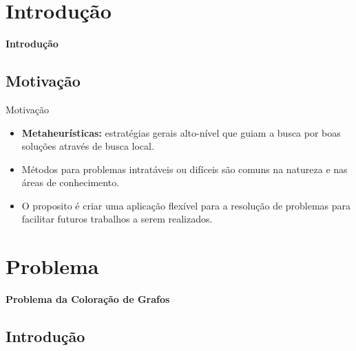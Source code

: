 

\section{Introdução}
	\begin{frame}{}
		\centering
		\Huge \color{blue} \textbf{Introdução}
	\end{frame}

	\subsection{Motivação}	
	
		\begin{frame}{Motivação \cite{Diego}}
			
			\begin{itemize}
				
				\item \textbf{Metaheurísticas:} estratégias gerais alto-nível que guiam a busca por boas soluções através de busca local.
				
				\bigskip
				
				\item Métodos para problemas intratáveis ou difíceis são comuns na natureza e nas áreas de conhecimento.
				
				\bigskip
				
				\item O proposito é criar uma aplicação flexível para a resolução de problemas para facilitar futuros trabalhos a serem realizados.
				
			\end{itemize}
			
		\end{frame}
		
		
		
\section{Problema}
	\begin{frame}{}
		\centering
		\Huge \color{blue} \textbf{Problema da Coloração de Grafos}
	\end{frame}
	
	\subsection{Introdução}

